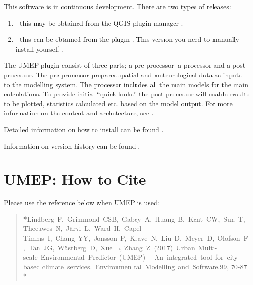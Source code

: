 \documentclass[letterpaper,10pt,english]{sphinxmanual}
\begin{document}
This software is in continuous development. There are two types of
releases:
\begin{enumerate}
\item {} 
 - this may be obtained from the QGIS plugin
manager {\hyperref[\detokenize{Getting_Started::doc}]{}}.

\item {} 
 - this can be obtained from the plugin
. This
version you need to manually install yourself {\hyperref[\detokenize{Getting_Started::doc}]{}}.

\end{enumerate}

The UMEP plugin consist of three
parts; a pre-processor, a processor and a post-processor. The
pre-processor prepares spatial and meteorological data as inputs to the
modelling system. The processor includes all the main models for the
main calculations. To provide initial “quick looks” the post-processor
will enable results to be plotted, statistics calculated etc. based on
the model output. For more information on the content and archetecture,
see {\hyperref[\detokenize{Introduction:pluginarchitecture}]{}}.

Detailed information on how to install can be found {\hyperref[\detokenize{Getting_Started::doc}]{}}.

Information on version history can be found .


\section{UMEP: How to Cite}
\label{\detokenize{Introduction:umep-how-to-cite}}
Please use the reference below when UMEP is used:
\begin{quote}

{\color{red}\bfseries{}*}Lindberg F, Grimmond CSB, Gabey A, Huang B, Kent CW, Sun T, Theeuwes N, Järvi L, Ward H, Capel-
Timms I, Chang YY, Jonsson P, Krave N, Liu D, Meyer D, Olofson F, Tan JG, Wästberg D, Xue L,
Zhang Z (2017) Urban Multi-scale Environmental Predictor (UMEP) - An integrated tool for city-based
climate services. Environmen tal Modelling and Software.99, 70-87  *
\end{quote}
\end{document}
